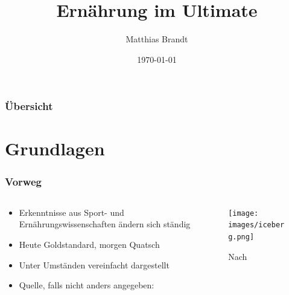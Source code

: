 \documentclass[ngerman, aspectratio=169]{beamer}
\title{Ernährung im Ultimate}
\date{\today}
\author[M. Brandt]{Matthias Brandt}
\institute{Deutscher\par Frisbeesport-Verband e.V.}
\begin{document}
\begin{frame}
  \titlepage
\end{frame}

\begin{frame}
  \frametitle{Übersicht}
  \tableofcontents
\end{frame}

\section{Grundlagen}
\begin{frame}
  \frametitle{Vorweg}
  \begin{columns}
    \begin{column}{0.7\textwidth}
      \begin{itemize}
        \begin{itemize}
        \item Erkenntnisse aus Sport- und Ernährungswissenschaften ändern sich ständig
        \item Heute Goldstandard, morgen Quatsch
        \item Unter Umständen vereinfacht dargestellt
        \item Quelle, falls nicht anders angegeben:\\ \textcite{raschka2015sport}
        \end{itemize}

      \end{itemize}
    \end{column}
    
    \begin{column}{0.3\textwidth}
      \begin{figure}
        \centering
        \texttt{[image: images/iceberg.png]}      
        \caption{Nach \cite{kils2005iceberg}}
        \label{fig:iceberg}
      \end{figure}
    \end{column}
    
  \end{columns}
\end{frame}
\end{document}
